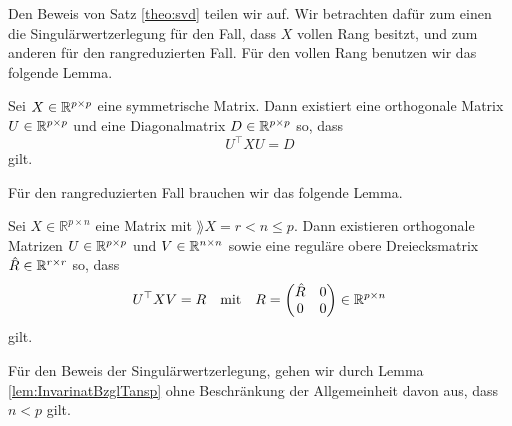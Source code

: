 \documentclass[../Bachelor_LennartKoliwer.tex]{subfiles}
\begin{document}
Den Beweis von Satz \ref{theo:svd} teilen wir auf. Wir betrachten dafür zum einen die Singulärwertzerlegung für den Fall, dass $X$ vollen Rang besitzt, und zum anderen für den rangreduzierten Fall.
Für den vollen Rang benutzen wir das folgende Lemma.

\begin{lemma} \label{lem:diagonal}
	Sei \(X\in\mathbb{R}^{p\times p}\) eine symmetrische Matrix. Dann existiert eine orthogonale Matrix \(U\in\mathbb{R}^{p\times p}\) und eine Diagonalmatrix $D\in\mathbb{R}^{p\times p}$ so, dass
	\[
		U^\top XU = D
	\]
	gilt.
\end{lemma}

Für den rangreduzierten Fall brauchen wir das folgende Lemma.

\begin{lemma} \label{lem:obereDreiecks}
	Sei \(X\in \mathbb{R}^{p\times n}\) eine Matrix mit \(\rang X = r < n \leq p\). Dann existieren orthogonale Matrizen \(U\in\mathbb{R}^{p\times p}\) und \(V\in\mathbb{R}^{n\times n}\) sowie eine reguläre obere Dreiecksmatrix $\hat{R}\in\mathbb{R}^{r\times r}$ so, dass
	\[
		U^\top X V=R \quad\text{mit}\quad R = \begin{pmatrix}
			\hat{R} & 0 \\
			0       & 0
		\end{pmatrix} \in \mathbb{R}^{p\times n}
	\]
	gilt.
\end{lemma}




Für den Beweis der Singulärwertzerlegung, gehen wir durch Lemma \ref{lem:InvarinatBzglTansp} ohne Beschrän\-kung der Allgemeinheit davon aus, dass $n<p$ gilt.
\end{document}
